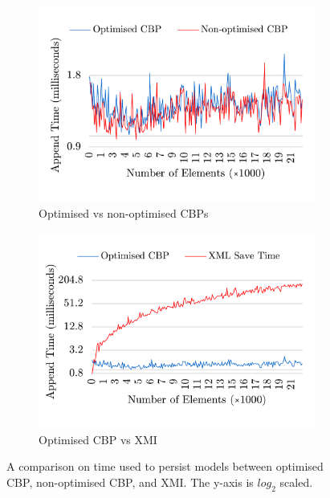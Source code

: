 \documentclass{llncs}
\begin{document}
\begin{figure}[ht]	
    \begin{subfigure}[t]{0.5\linewidth}
		\includegraphics[width=\linewidth]{append_speed_conf}
		\caption{Optimised vs non-optimised CBPs}\label{fig:append_speed_conf}
	\end{subfigure}
	\hfill
	\begin{subfigure}[t]{0.5\linewidth}
		\includegraphics[width=\linewidth]{append_speed_conf_ocbp_xmi}
		\caption{Optimised CBP vs XMI}\label{fig:append_speed_conf_ocbp_xmi}		
	\end{subfigure}	
	\caption{A comparison on time used to persist models between optimised CBP, non-optimised CBP, and XMI. The y-axis is $log_2$ scaled.}
	\label{fig:append_speed}
\end{figure}
\end{document}
